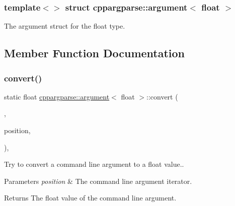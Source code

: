 \subsubsection*{template$<$$>$\newline
struct cppargparse\+::argument$<$ float $>$}

The argument struct for the float type. 

\subsection{Member Function Documentation}
\mbox{\label{structcppargparse_1_1argument_3_01float_01_4_a3dd5dba91fc35f277138619066d7db24}} 
\subsubsection{\texorpdfstring{convert()}{convert()}}
{\footnotesize\ttfamily static float \hyperlink{structcppargparse_1_1argument}{cppargparse\+::argument}$<$ float $>$\+::convert (\begin{DoxyParamCaption}\item[{const \hyperlink{types_8h_a80adf2418b7ce9fe616698efa7533ecf}{types\+::\+Command\+Line\+\_\+t} \&}]{,  }\item[{const \hyperlink{types_8h_a43b4f43f8940de1bf09ced6f1b668053}{types\+::\+Command\+Line\+Position\+\_\+t} \&}]{position,  }\item[{const \hyperlink{types_8h_a003c660afe2ee9c6cc39aea966e8926d}{types\+::\+Command\+Line\+Arguments\+\_\+t} \&}]{ }\end{DoxyParamCaption})\hspace{0.3cm}{\ttfamily [inline]}, {\ttfamily [static]}}



Try to convert a command line argument to a float value.. 


\begin{DoxyParams}{Parameters}
{\em position} & The command line argument iterator.\\
\hline
\end{DoxyParams}
\begin{DoxyReturn}{Returns}
The float value of the command line argument. 
\end{DoxyReturn}
\mbox{\label{structcppargparse_1_1argument_3_01float_01_4_a6c02321d1fcc25ffa950948ab642e64f}} 
